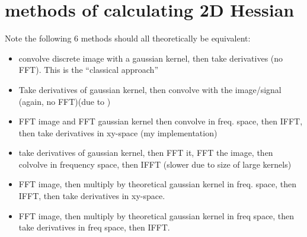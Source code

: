 

\section{methods of calculating 2D Hessian}

Note the following 6 methods should all theoretically be equivalent:

\begin{itemize}
\item convolve discrete image with a gaussian kernel, then take derivatives (no FFT). This is the ``classical approach''
\item Take derivatives of gaussian kernel, then convolve with the image/signal (again, no FFT)(due to )
\item FFT image and FFT gaussian kernel then convolve in freq. space, then IFFT, then take derivatives in xy-space (my implementation)
\item take derivatives of gaussian kernel, then FFT it,  FFT the image, then colvolve in frequency space, then  IFFT (slower due to size of large kernels)
\item FFT image, then multiply by theoretical gaussian kernel in freq. space, then IFFT, then take derivatives in xy-space.
\item FFT image, then multiply by theoretical gaussian kernel in freq space, then take derivatives in freq space, then IFFT.


\end{itemize}





